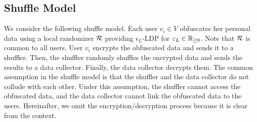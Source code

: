 \subsection{Shuffle Model}
\label{sub:shuffle}
We consider the following shuffle model. 
Each user $v_i \in V$ obfuscates her personal data 
using a local randomizer $\mathcal{R}$ providing $\epsilon_L$-LDP for $\varepsilon_L \in \mathbb{R}_{\ge0}$. 
Note that $\mathcal{R}$ is common to all users. 
User $v_i$ encrypts the obfuscated data and sends it to a shuffler. 
Then, the shuffler randomly shuffles the encrypted data and sends the results to a data collector. 
Finally, the data collector decrypts them. 
The common assumption in the shuffle model is that the shuffler and the data collector do not collude with each other. 
Under this assumption, the shuffler cannot access the obfuscated data, and the data collector cannot link the obfuscated data to the users. 
Hereinafter, we omit the encryption/decryption process because it is clear from the context. 

